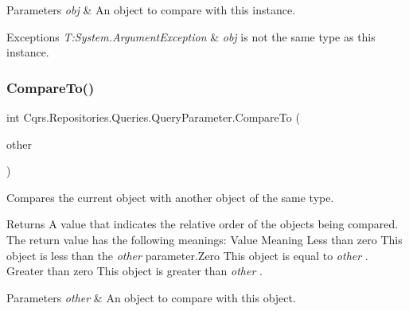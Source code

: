 \begin{DoxyParams}{Parameters}
{\em obj} & An object to compare with this instance. \\
\hline
\end{DoxyParams}

\begin{DoxyExceptions}{Exceptions}
{\em T\+:\+System.\+Argument\+Exception} & {\itshape obj}  is not the same type as this instance. \\
\hline
\end{DoxyExceptions}
\mbox{\label{classCqrs_1_1Repositories_1_1Queries_1_1QueryParameter_a48fa36fe6189bb03008b7f9fa3d30267_a48fa36fe6189bb03008b7f9fa3d30267}} 
\subsubsection{\texorpdfstring{Compare\+To()}{CompareTo()}\hspace{0.1cm}{\footnotesize\ttfamily [2/2]}}
{\footnotesize\ttfamily int Cqrs.\+Repositories.\+Queries.\+Query\+Parameter.\+Compare\+To (\begin{DoxyParamCaption}\item[{\hyperlink{classCqrs_1_1Repositories_1_1Queries_1_1QueryParameter}{Query\+Parameter}}]{other }\end{DoxyParamCaption})}



Compares the current object with another object of the same type. 

\begin{DoxyReturn}{Returns}
A value that indicates the relative order of the objects being compared. The return value has the following meanings\+: Value Meaning Less than zero This object is less than the {\itshape other}  parameter.\+Zero This object is equal to {\itshape other} . Greater than zero This object is greater than {\itshape other} . 
\end{DoxyReturn}

\begin{DoxyParams}{Parameters}
{\em other} & An object to compare with this object.\\
\hline
\end{DoxyParams}
\mbox{\label{classCqrs_1_1Repositories_1_1Queries_1_1QueryParameter_a14f2f14cba8d0807bb80d7b8d2c7e59a_a14f2f14cba8d0807bb80d7b8d2c7e59a}} 
